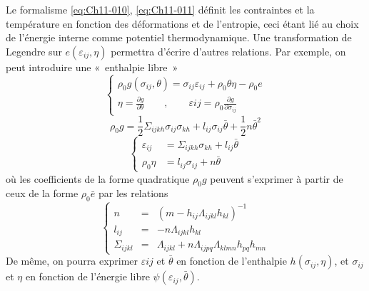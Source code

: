 Le formalisme \eqref{eq:Ch11-010}, \eqref{eq:Ch11-011} définit les contraintes et la température en fonction des déformations et de l'entropie, ceci étant lié au choix de l'énergie interne comme potentiel thermodynamique.
Une transformation de Legendre sur $e(\varepsilon_{ij},\eta)$ permettra d'écrire d'autres relations.
Par exemple, on peut introduire une «~enthalpie libre~»
\begin{equation}
 \left\{
  \begin{aligned}
    \rho_0 g(\sigma_{ij},\theta) = \sigma_{ij}\varepsilon_{ij} + \rho_0 \theta \eta - \rho_0 e \\
    \eta = \frac{\partial g}{\partial \theta} \qquad,\qquad \varepsilon{ij} = \rho_0 \frac{\partial g}{\partial \sigma_{ij}}
  \end{aligned}
  \right.
    \label{eq:Ch11-014}
\end{equation}
\begin{equation}
    \rho_0 g = \frac{1}{2} \Sigma_{ijkh} \sigma_{ij}\sigma_{kh} + l_{ij} \sigma_{ij} \bar{\theta} +\frac{1}{2} n \bar{\theta}^2
    \label{eq:Ch11-015}
\end{equation}
\begin{equation}
    \left\{
    \begin{aligned}
        \varepsilon_{ij} & = \Sigma_{ijkh} \sigma_{kh} + l_{ij} \bar{\theta} \\
        \rho_0 \eta      & = l_{ij} \sigma_{ij} + n \bar{\theta}
    \end{aligned}
    \right.
    \label{eq:Ch11-016}
\end{equation}
où les coefficients de la forme quadratique $\rho_0 g$ peuvent s'exprimer à partir de ceux de la forme $\rho_0 \bar{e}$ par les relations 
\begin{equation}
 \left\{
  \begin{aligned}
    n             & = & \left(m - h_{ij} \Lambda_{ijkl} h_{kl}\right)^{-1} \\
    l_{ij}        & = & -n \Lambda_{ijkl} h_{kl} \\
    \Sigma_{ijkl} & = & \Lambda_{ijkl} + n \Lambda_{ijpq}\Lambda_{klmn} h_{pq} h_{mn}
  \end{aligned}
  \right.
    \label{eq:Ch11-016}
\end{equation}
De même, on pourra exprimer $\varepsilon{ij}$ et $\bar{\theta}$ en fonction de l'enthalpie $h(\sigma_{ij},\eta)$, et $\sigma_{ij}$ et $\eta$ en fonction de l'énergie libre $\psi(\varepsilon_{ij},\bar{\theta})$. 

